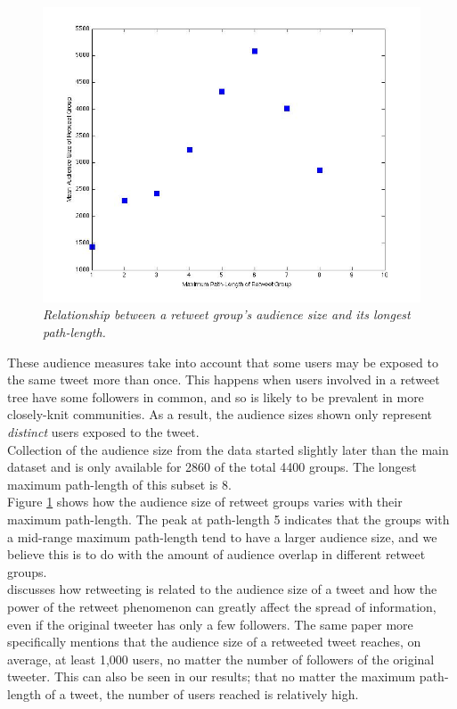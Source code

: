 \begin{figure}[h]
\includegraphics[scale=0.35]{4.Chapter1/Media/audience-pathlength.jpg} 
\caption{\textit{Relationship between a retweet group's audience size and its longest path-length.}}
\label{fig:pathlength-audience}
\end{figure}
These audience measures take into account that some users may be exposed to the same tweet more than once. This happens when users involved in a retweet tree have some followers in common, and so is likely to be prevalent in more closely-knit communities. As a result, the audience sizes shown only represent \textit{distinct} users exposed to the tweet.\\
Collection of the audience size from the data started slightly later than the main dataset and is only available for 2860 of the total 4400 groups. The longest maximum path-length of this subset is 8.\\
Figure \ref{fig:pathlength-audience} shows how the audience size of retweet groups varies with their maximum path-length. The peak at path-length 5 indicates that the groups with a mid-range maximum path-length tend to have a larger audience size, and we believe this is to do with the amount of audience overlap in different retweet groups.\\
\cite{kwak10} discusses how retweeting is related to the audience size of a tweet and how the power of the retweet phenomenon can greatly affect the spread of information, even if the original tweeter has only a few followers. The same paper more specifically mentions that the audience size of a retweeted tweet reaches, on average, at least 1,000 users, no matter the number of followers of the original tweeter. This can also be seen in our results; that no matter the maximum path-length of a tweet, the number of users reached is relatively high.\\

